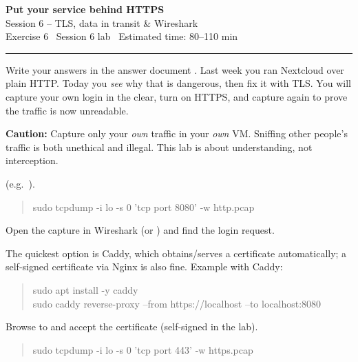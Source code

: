 \documentclass[11pt]{article}
\begin{document}
\begin{center}
  {\LARGE\bfseries Put your service behind HTTPS}\\[3pt]
  {\large Session 6 -- TLS, data in transit \& Wireshark}\\[5pt]
  {\small Exercise 6 \textperiodcentered\ Session 6 lab \textperiodcentered\ Estimated time: 80--110 min}
\end{center}
\vspace{2pt}\hrule\vspace{1.1em}

Write your answers in the answer document . Last week you ran Nextcloud over plain HTTP. Today you
\emph{see} why that is dangerous, then fix it with TLS. You will capture your own login in the clear,
turn on HTTPS, and capture again to prove the traffic is now unreadable.

\noindent\textbf{Caution:} Capture only your \emph{own} traffic in your \emph{own} VM. Sniffing other
people's traffic is both unethical and illegal. This lab is about understanding, not interception.

 (e.g.\ ).
\begin{quote}\ttfamily
sudo tcpdump -i lo -s 0 'tcp port 8080' -w http.pcap
\end{quote}
Open the capture in Wireshark (or ) and find the login request.

 The quickest option is Caddy, which obtains/serves
a certificate automatically; a self-signed certificate via Nginx is also fine. Example with Caddy:
\begin{quote}\ttfamily
sudo apt install -y caddy\\
sudo caddy reverse-proxy --from https://localhost --to localhost:8080
\end{quote}
Browse to  and accept the certificate (self-signed in the lab).

\begin{quote}\ttfamily
sudo tcpdump -i lo -s 0 'tcp port 443' -w https.pcap
\end{quote}
\end{document}
